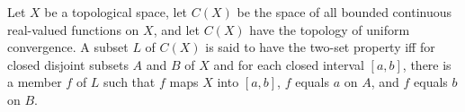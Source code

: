 Let $X$ be a topological space, let $C(X)$ be the space of all bounded continuous real-valued functions on $X$, and let $C(X)$ have the topology of uniform convergence. A subset $L$ of $C(X)$ is said to have the two-set property iff for closed disjoint subsets $A$ and $B$ of $X$ and for each closed interval $[a,b]$, there is a member $f$ of $L$ such that $f$ maps $X$ into $[a,b]$, $f$ equals $a$ on $A$, and $f$ equals $b$ on $B$.
